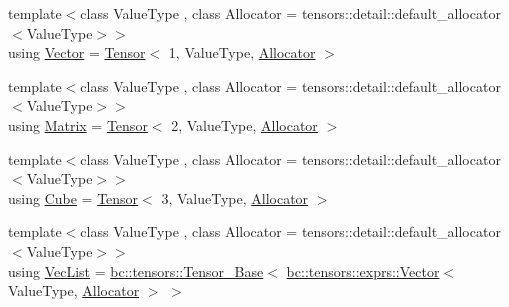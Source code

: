 \begin{DoxyCompactItemize}
\item 
{\footnotesize template$<$class Value\+Type , class Allocator  = tensors\+::detail\+::default\+\_\+allocator$<$\+Value\+Type$>$$>$ }\\using \hyperlink{namespacebc_a14d40e8e95957f92a57853921837a15d}{Vector} = \hyperlink{namespacebc_a659391e47ab612be3ba6c18cf9c89159}{Tensor}$<$ 1, Value\+Type, \hyperlink{classbc_1_1allocators_1_1Allocator}{Allocator} $>$
\item 
{\footnotesize template$<$class Value\+Type , class Allocator  = tensors\+::detail\+::default\+\_\+allocator$<$\+Value\+Type$>$$>$ }\\using \hyperlink{namespacebc_a92dd1e243183b382432a5fac3ed8b89f}{Matrix} = \hyperlink{namespacebc_a659391e47ab612be3ba6c18cf9c89159}{Tensor}$<$ 2, Value\+Type, \hyperlink{classbc_1_1allocators_1_1Allocator}{Allocator} $>$
\item 
{\footnotesize template$<$class Value\+Type , class Allocator  = tensors\+::detail\+::default\+\_\+allocator$<$\+Value\+Type$>$$>$ }\\using \hyperlink{namespacebc_a6fe72f55a3d16b9ee2e35beae746af90}{Cube} = \hyperlink{namespacebc_a659391e47ab612be3ba6c18cf9c89159}{Tensor}$<$ 3, Value\+Type, \hyperlink{classbc_1_1allocators_1_1Allocator}{Allocator} $>$
\item 
{\footnotesize template$<$class Value\+Type , class Allocator  = tensors\+::detail\+::default\+\_\+allocator$<$\+Value\+Type$>$$>$ }\\using \hyperlink{namespacebc_acb7a07eb9e2d0927fcb611a35d99dc5c}{Vec\+List} = \hyperlink{classbc_1_1tensors_1_1Tensor__Base}{bc\+::tensors\+::\+Tensor\+\_\+\+Base}$<$ \hyperlink{structbc_1_1tensors_1_1exprs_1_1Vector}{bc\+::tensors\+::exprs\+::\+Vector}$<$ Value\+Type, \hyperlink{classbc_1_1allocators_1_1Allocator}{Allocator} $>$ $>$
\end{DoxyCompactItemize}
